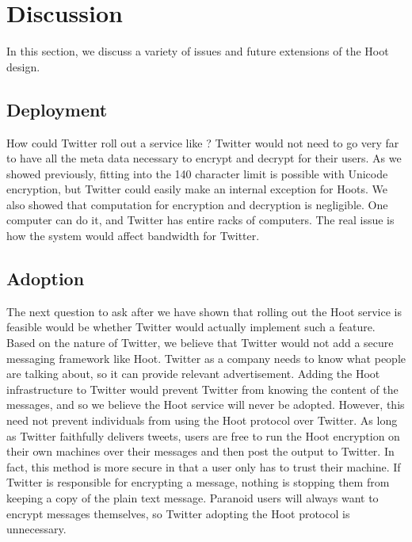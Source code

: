 \section{Discussion} \label{sec:discuss}

In this section, we discuss a variety of issues and future extensions of the Hoot design.

\subsection{Deployment}

How could Twitter roll out a service like \hoot? Twitter would not need to go very far to have all the meta data necessary to encrypt and decrypt for their users.  As we showed previously, fitting into the 140 character limit is possible with Unicode encryption, but Twitter could easily make an internal exception for Hoots. We also showed that computation for encryption and decryption is negligible. One computer can do it, and Twitter has entire racks of computers. The real issue is how the \hoot system would affect bandwidth for Twitter. 


\subsection{Adoption}	

The next question to ask after we have shown that rolling out the Hoot service is feasible would be whether Twitter would actually implement such a feature. Based on the nature of Twitter, we believe that Twitter would not add a secure messaging framework like Hoot. Twitter as a company needs to know what people are talking about, so it can provide relevant advertisement. Adding the Hoot infrastructure to Twitter would prevent Twitter from knowing the content of the messages, and so we believe the Hoot service will never be adopted. However, this need not prevent individuals from using the Hoot protocol over Twitter. As long as Twitter faithfully delivers tweets, users are free to run the Hoot encryption on their own machines over their messages and then post the output to Twitter. In fact, this method is more secure in that a user only has to trust their machine. If Twitter is responsible for encrypting a message, nothing is stopping them from keeping a copy of the plain text message. Paranoid users will always want to encrypt messages themselves, so Twitter adopting the Hoot protocol is unnecessary.
		
